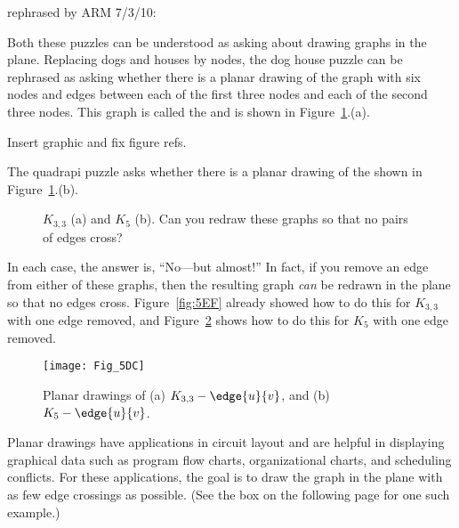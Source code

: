 \begin{staffnotes}
rephrased by ARM 7/3/10:
\end{staffnotes}

Both these puzzles can be understood as asking about drawing graphs in the
plane.  Replacing dogs and houses by nodes, the dog house puzzle can be
rephrased as asking whether there is a planar drawing of the graph with
six nodes and edges between each of the first three nodes and each of the
second three nodes.  This graph is called the  and is shown in Figure~\ref{fig:nonplanar}.(a).
\begin{editingnotes}
Insert graphic and fix figure refs.
\end{editingnotes}
The quadrapi puzzle asks whether there is a planar drawing of the
  shown in
Figure~\ref{fig:nonplanar}.(b).

\begin{figure}\redrawn

\qquad\qquad
{}

\caption{$K_{3, 3}$ (a) and $K_5$ (b).  Can you redraw these graphs so
that no pairs of edges cross?}

\label{fig:nonplanar}

\end{figure}

In each case, the answer is, ``No---but almost!''  In fact, if you remove
an edge from either of these graphs, then the resulting graph \emph{can}
be redrawn in the plane so that no edges cross.  Figure~\ref{fig:5EF}
already showed how to do this for $K_{3,3}$ with one edge removed, and
Figure~\ref{fig:5DC} 
shows how to do this for $K_5$ with one edge removed.

\begin{figure}\redrawn


\texttt{[image: Fig\_5DC]}

\caption{Planar drawings of (a) $K_{3, 3} - \edge{u}{v}$, and (b) $K_5
  - \edge{u}{v}$.}
\label{fig:5DC}
\end{figure}

Planar drawings have applications in circuit layout and are helpful in
displaying graphical data such as program flow charts, organizational
charts, and scheduling conflicts.  For these applications, the goal is
to draw the graph in the plane with as few edge crossings as possible.
(See the box on the following page for one such example.)

